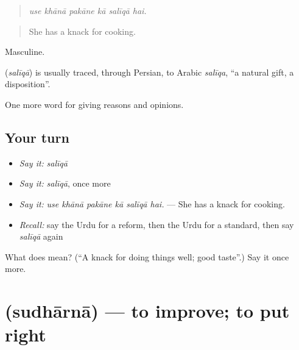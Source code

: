\begin{quote}
     
\end{quote}

\begin{quote}
\emph{use khānā pakāne kā salīqā hai.}
\end{quote}

\begin{quote}
She has a knack for cooking.
\end{quote}

Masculine.

\begin{cousinweb}
\textbf{} (\emph{salīqā}) is usually traced, through Persian, to Arabic \emph{salīqa}, \textquotedblleft{}a natural gift, a disposition\textquotedblright{}.
\end{cousinweb}

\begin{grammarlens}[title={What you've built}]
One more word for giving reasons and opinions.
\end{grammarlens}

\subsection*{Your turn}
\begin{itemize}
\raggedright
  \item \emph{Say it:} \emph{salīqā}
  \item \emph{Say it:} \emph{salīqā}, once more
  \item \emph{Say it:} \emph{use khānā pakāne kā salīqā hai.} — She has a knack for cooking.
  \item \emph{Recall:} say the Urdu for a reform, then the Urdu for a standard, then say \emph{salīqā} again
\end{itemize}

\begin{tcolorbox}[breakable,colback=teal!4,colframe=teal!35!black,title={Before you move on}]
What does  mean? (\textquotedblleft{}A knack for doing things well; good taste\textquotedblright{}.) Say it once more.
\end{tcolorbox}
\section[\texorpdfstring{\ur{سدھارنا} (sudhārnā)}{سدھارنا (sudhārnā)}]{ (sudhārnā) — to improve; to put right}

